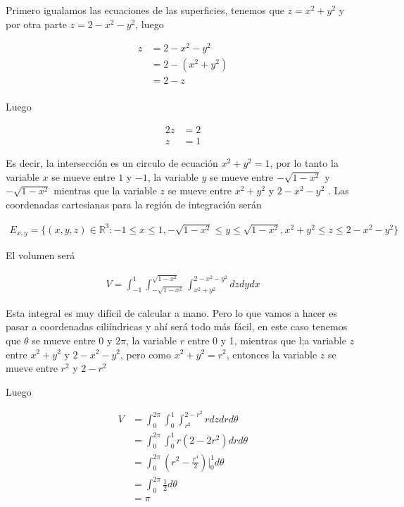 \documentclass{article}
\theoremstyle{plain}
\theoremstyle{definition}
\begin{document}
Primero igualamos las ecuaciones de las superficies, tenemos que $z= x^2+y^2$ y por otra parte $z=2-x^2-y^2$, luego

\begin{align*}
    z &=2-x^2-y^2 \\
    &=2-(x^2+y^2) \\
    &=2-z \\
\end{align*}

Luego

\begin{align*}
    2z &= 2 \\
    z &= 1
\end{align*}

Es decir, la intersecci\'on es un circulo de ecuaci\'on $x^2+y^2=1$, por lo tanto la variable $x$ se mueve entre $1$ y $-1$, la variable $y$ se mueve entre $ -\sqrt{1-x^2}$ y  $ -\sqrt{1-x^2}$ mientras que la variable $z$ se mueve entre $x^2+y^2$ y $2-x^2-y^2$ . Las coordenadas cartesianas para la regi\'on de integraci\'on ser\'an

\begin{align*}
    E_{x,y} = \lbrace (x,y,z) \in \mathbb{R}^3 : -1 \leq x \leq 1, -\sqrt{1-x^2} \leq y \leq \sqrt{1-x^2}, x^2+y^2 \leq z \leq 2-x^2-y^2\rbrace
\end{align*}

El volumen ser\'a

\begin{align*}
    V = \int_{-1}^1\int_{-\sqrt{1-x^2}}^{\sqrt{1-x^2}}\int_{x^2+y^2}^{2-x^2-y^2} dz dy dx
\end{align*}

Esta integral es muy dif\'icil de calcular a mano. Pero lo que vamos a hacer es pasar a coordenadas cili\'indricas y ah\'i ser\'a todo m\'as f\'acil, en este caso tenemos que $\theta$ se mueve entre 0 y $2\pi$, la variable $r$ entre 0 y 1, mientras que l;a variable $z$ entre  $x^2+y^2$ y $2-x^2-y^2$, pero como $x^2+y^2 = r^2$, entonces la variable $z$ se mueve entre  $r^2$ y $2-r^2$



Luego


\begin{align*}
    V &= \int_{0}^{2\pi}\int_{0}^{1}\int_{r^2}^{2-r^2} r dz dr d\theta \\
    &= \int_{0}^{2\pi}\int_{0}^{1} r(2-2r^2)  dr d\theta  \\
    &= \int_{0}^{2\pi} \left( r^2 -\frac{r^4}{2}\right)\bigg|_0^1 d\theta  \\
    &= \int_{0}^{2\pi} \frac{1}{2}d\theta  \\
    &= \pi
\end{align*}
\end{document}
